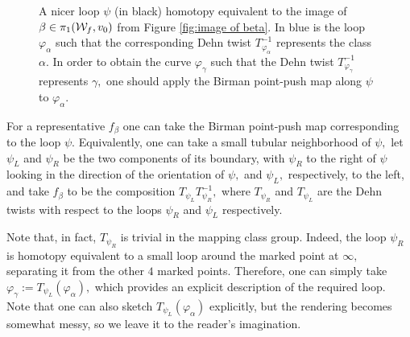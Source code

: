 \documentclass{article}
\begin{document}
\begin{figure}
\centering
{}
    \caption{A nicer loop $\psi$ (in black) homotopy equivalent to the image of $\beta\in\pi_1(\mathcal{W}_f,v_0)$ from Figure \ref{fig:image of beta}. In blue is the loop $\varphi_\alpha$ such that the corresponding Dehn twist $T_{\varphi_\alpha}^{-1}$ represents the class $\alpha.$ In order to obtain the curve $\varphi_\gamma$ such that the Dehn twist $T_{\varphi_\gamma}^{-1}$ represents $\gamma,$ one should apply the Birman point-push map along $\psi$ to $\varphi_\alpha.$}
    \label{fig:image of beta 2}
\end{figure}

For a representative $f_\beta$ one can take the Birman point-push map corresponding to the loop $\psi.$ Equivalently, one can take a small tubular neighborhood of $\psi,$ let $\psi_L$ and $\psi_R$ be the two components of its boundary, with $\psi_R$ to the right of $\psi$ looking in the direction of the orientation of $\psi,$ and $\psi_L,$ respectively, to the left, and take $f_\beta$ to be the composition $T_{\psi_L}T_{\psi_R}^{-1},$ where $T_{\psi_R}$ and $T_{\psi_L}$ are the Dehn twists with respect to the loops $\psi_R$ and $\psi_L$ respectively.


Note that, in fact, $T_{\psi_R}$ is trivial in the mapping class group. Indeed, the loop $\psi_R$ is homotopy equivalent to a small loop around the marked point at $\infty,$ separating it from the other $4$ marked points. Therefore, one can simply take $\varphi_\gamma:=T_{\psi_L}(\varphi_\alpha),$ which provides an explicit description of the required loop. Note that one can also sketch $T_{\psi_L}(\varphi_\alpha)$ explicitly, but the rendering becomes somewhat messy, so we leave it to the reader's imagination.
\end{document}

